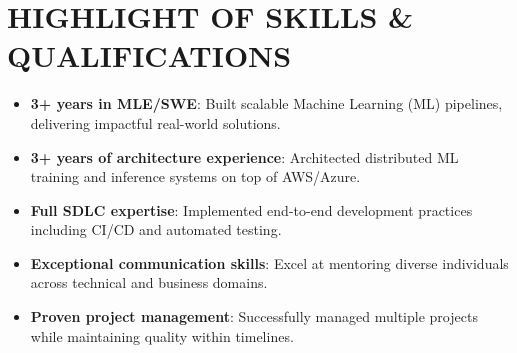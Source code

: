 \section{HIGHLIGHT OF SKILLS \& QUALIFICATIONS}
\begin{itemize}
    \item \textbf{3+ years in MLE/SWE}: Built scalable Machine Learning (ML) pipelines, delivering impactful real-world solutions.
    \item \textbf{3+ years of architecture experience}: Architected distributed ML training and inference systems on top of AWS/Azure.   
    \item \textbf{Full SDLC expertise}: Implemented end-to-end development practices including CI/CD and automated testing.
    \item \textbf{Exceptional communication skills}: Excel at mentoring diverse individuals across technical and business domains.
    \item \textbf{Proven project management}: Successfully managed multiple projects while maintaining quality within timelines.
\end{itemize}